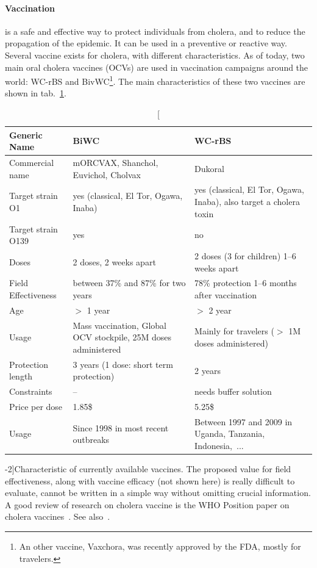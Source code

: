 \paragraph{Vaccination} is a safe and effective way to protect individuals from cholera, and to reduce the propagation of the epidemic. It can be used in a preventive or reactive way. Several vaccine exists for cholera, with different characteristics. As of today, two main oral cholera vaccines (OCVs) are used in vaccination campaigns around the world: WC-rBS and BivWC\footnote[][-3\baselineskip]{An other vaccine, Vaxchora, was recently approved by the FDA, mostly for travelers.}. The main characteristics of these two vaccines are shown in tab.~\ref{tab:vacc}.

\begin{table}[h]
\centering\small
\label{tab:prior}
\begin{tabular}{lp{40mm}p{40mm}}
\toprule
Generic Name &  BiWC & WC-rBS\\ 
\midrule
Commercial name   &  mORCVAX, Shanchol,  Euvichol, Cholvax & Dukoral  \\
Target strain O1 &   yes (classical, El Tor, Ogawa, Inaba)& yes (classical, El Tor, Ogawa, Inaba), also  target a cholera toxin  \\
Target strain O139   &  yes &      no     \\
Doses   &  2 doses, 2 weeks apart & 2 doses (3 for children) 1--6 weeks apart  \\
Field Effectiveness  & between 37\% and 87\% for two years & 78\% protection 1--6 months after vaccination\\
Age   &  $>$ 1 year & $>$ 2 year      \\
Usage & Mass vaccination, Global OCV stockpile, 25M doses administered & Mainly for travelers ($>$ 1M doses administered)\\
Protection length & 3 years (1 dose: short term protection) & 2 years\\
Constraints & -- & needs buffer solution\\
Price per dose & 1.85\$ & 5.25\$ \\ 
Usage & Since 1998 in most recent outbreaks & Between 1997 and 2009 in Uganda, Tanzania, Indonesia,~... \\
\bottomrule
\end{tabular}
\caption[Characteristic of currently available vaccines][-2\baselineskip]{Characteristic of currently available vaccines. The proposed value for field effectiveness, along with vaccine efficacy (not shown here) is really difficult to evaluate, cannot be written in a simple way without omitting crucial information. A good review of research on cholera vaccine is the WHO Position paper on cholera vaccines~. See also~\textcite{WHO:BackgroundPaperWholeCell:2017,Azman:PopulationLevelEffectCholera:2016,Luquero:FirstOutbreakResponse:2013,WHO:BackgroundPaperIntegration:2009,Luquero:UseVibrioCholerae:2014,Qadri:EfficacySingledoseRegimen:2018,Bi:ProtectionCholeraKilled:2017,Azman:ImpactOneDoseTwoDose:2015,Tohme:OralCholeraVaccine:2015}.}
\label{tab:vacc}
\end{table}

